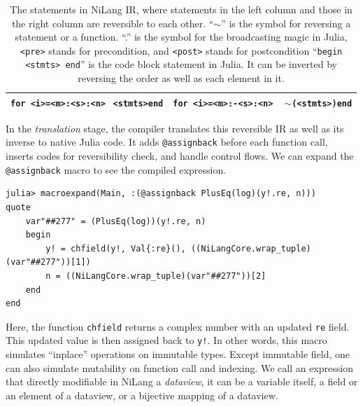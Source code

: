 \documentclass{article}
\newcommand{\<}{\langle}
\renewcommand{\>}{\rangle}
\newcommand{\cquad}{{{ }_{\quad}}}
\theoremstyle{definition}\newtheorem{definition}{\textit{Definition}}
\begin{document}
\begin{table}[h!]
\begin{minipage}{0.8\columnwidth}
{\begin{tabularx}{\textwidth}{X X}
            \hline
            \texttt{for <i>=<m>:<s>:<n>}\newline $\cquad$\texttt{<stmts>}\newline \texttt{end} & \texttt{for <i>=<m>:-<s>:<n>}\newline $\cquad$ \texttt{$\sim$(<stmts>)}\newline \texttt{end}\\
            \bottomrule
        \end{tabularx}
    }
    \caption{The statements in NiLang IR, where statements in the left column and those in the right column are reversible to each other.
    ``$\sim$'' is the symbol for reversing a statement or a function.
    ``.'' is the symbol for the broadcasting magic in Julia,
    \texttt{<pre>} stands for precondition, and \texttt{<post>} stands for postcondition
``\texttt{begin <stmts> end}'' is the code block statement in Julia.
It can be inverted by reversing the order as well as each element in it.
}\label{tbl:revstatements}
\end{minipage}
\end{table}

In the \textit{translation} stage, the compiler translates this reversible IR as well as its inverse to native Julia code. It adds \texttt{@assignback} before each function call, inserts codes for reversibility check, and handle control flows.
We can expand the \texttt{@assignback} macro to see the compiled expression.

\begin{minipage}{.88\columnwidth}
\begin{lstlisting}
julia> macroexpand(Main, :(@assignback PlusEq(log)(y!.re, n)))
quote
    var"##277" = (PlusEq(log))(y!.re, n)
    begin
        y! = chfield(y!, Val{:re}(), ((NiLangCore.wrap_tuple)(var"##277"))[1])
        n = ((NiLangCore.wrap_tuple)(var"##277"))[2]
    end
end
\end{lstlisting}
\end{minipage}

Here, the function \texttt{chfield} returns a complex number with an updated \texttt{re} field. This updated value is then assigned back to \texttt{y!}.
In other words, this macro simulates ``inplace'' operations on immutable types.
Except immutable field, one can also simulate mutability on function call and indexing. We call an expression that directly modifiable in NiLang a \textit{dataview}, it can be a variable itself, a field or an element of a dataview, or a bijective mapping of a dataview.
\end{document}

